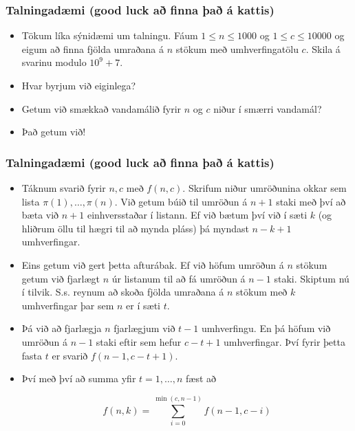 \documentclass{beamer}
\begin{document}
\begin{frame}
\frametitle{Talningadæmi (good luck að finna það á kattis)}

\begin{itemize}

\item<1-> Tökum líka sýnidæmi um talningu. Fáum $1 \leq n \leq 1000$ og $1 \leq c \leq 10000$ og eigum að finna fjölda umraðana á $n$ stökum með umhverfingatölu $c$. Skila á svarinu modulo $10^9 + 7$.

\item<2-> Hvar byrjum við eiginlega?

\item<3-> Getum við smækkað vandamálið fyrir $n$ og $c$ niður í smærri vandamál?

\item<4-> Það getum við!

\end{itemize}

\end{frame}

\begin{frame}
\frametitle{Talningadæmi (good luck að finna það á kattis)}

\begin{itemize}

\item<1-> Táknum svarið fyrir $n, c$ með $f(n, c)$. Skrifum niður umröðunina okkar sem lista $\pi(1), \dots, \pi(n)$. Við getum búið til umröðun á $n + 1$ staki með því að bæta við $n + 1$ einhversstaðar í listann. Ef við bætum því við í sæti $k$ (og hliðrum öllu til hægri til að mynda pláss) þá myndast $n - k + 1$ umhverfingar.

\item<2-> Eins getum við gert þetta afturábak. Ef við höfum umröðun á $n$ stökum getum við fjarlægt $n$ úr listanum til að fá umröðun á $n - 1$ staki. Skiptum nú í tilvik. S.s. reynum að skoða fjölda umraðana á $n$ stökum með $k$ umhverfingar þar sem $n$ er í sæti $t$.

\item<3-> Þá við að fjarlægja $n$ fjarlægjum við $t - 1$ umhverfingu. En þá höfum við umröðun á $n - 1$ staki eftir sem hefur $c - t + 1$ umhverfingar. Því fyrir þetta fasta $t$ er svarið $f(n - 1, c - t + 1)$.

\item<4-> Því með því að summa yfir $t = 1, \dots, n$ fæst að

\[f(n, k) = \sum_{i = 0}^{\min(c, n - 1)} f(n - 1, c - i)\]

\end{itemize}

\end{frame}
\end{document}
